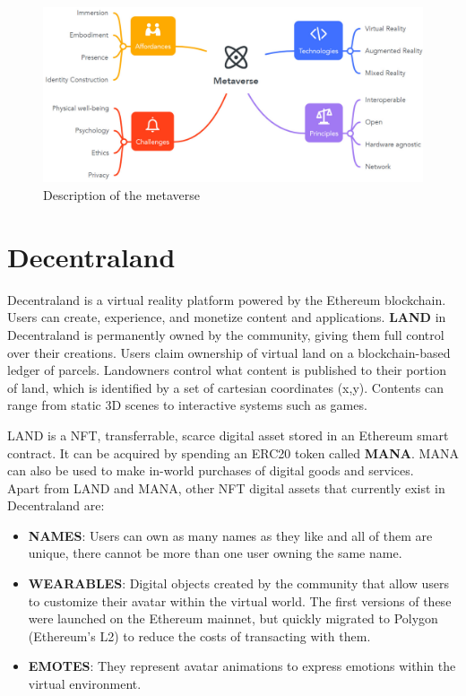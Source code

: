 \documentclass[MSE,Master,english]{twbook}%
\begin{document}
\begin{figure}[H]
  \centering
  \includegraphics[width=\textwidth]{metaverse.png}
  \caption{Description of the metaverse \cite{metaverse}}
  \label{fig:metaverse}
\end{figure}

\section{Decentraland}
Decentraland\cite{DCLWhitepaper} is a virtual reality platform powered by the Ethereum blockchain. Users can create, experience, and monetize content and applications. \textbf{\gls{LAND}} in Decentraland is permanently owned by the community, giving them full control over their creations. Users claim ownership of virtual land on a blockchain-based ledger of parcels. Landowners control what content is published to their portion of land, which is identified by a set of cartesian coordinates (x,y). Contents can range from static 3D scenes to interactive systems such as games. 

LAND\cite{DCLWhitepaper} is a \ac{NFT}, transferrable, scarce digital asset stored in an Ethereum smart contract. It can be acquired by spending an ERC20 token called \textbf{\gls{MANA}}. MANA can also be used to make in-world purchases of digital goods and services. \\

Apart from LAND and MANA, other NFT digital assets that currently exist in Decentraland are:

\begin{itemize}
  \item \textbf{NAMES}: Users can own as many names as they like and all of them are unique, there cannot be more than one user owning the same name.
  \item \textbf{WEARABLES}: Digital objects created by the community that allow users to customize their avatar within the virtual world. The first versions of these were launched on the Ethereum mainnet, but quickly migrated to Polygon (Ethereum's L2) to reduce the costs of transacting with them.
  \item \textbf{EMOTES}: They represent avatar animations to express emotions within the virtual environment.
\end{itemize}
\end{document}
